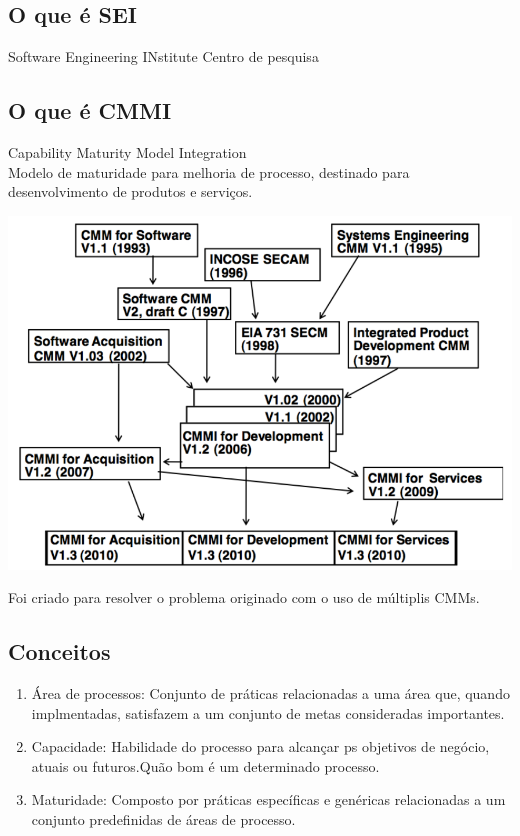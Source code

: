 \documentclass{article}
\begin{document}
\subsection{O que é SEI}
	Software Engineering INstitute \newline
	Centro de pesquisa

\subsection{O que é CMMI} 	
	Capability Maturity Model Integration \\
	Modelo de maturidade para melhoria de processo, destinado para desenvolvimento de produtos e serviços. \\
	\begin{center}
		\includegraphics[scale=0.35]{historico_cmmi} \\
	\end{center}
	Foi criado para resolver o problema originado com o uso de múltiplis CMMs.

\subsection{Conceitos}

\begin{enumerate}
\item Área de processos: Conjunto de práticas relacionadas a uma área que, quando implmentadas, satisfazem a um conjunto de metas consideradas importantes.
\item Capacidade: Habilidade do processo para alcançar ps objetivos de negócio, atuais ou futuros.Quão bom é um determinado processo.
\item Maturidade: Composto por práticas específicas e genéricas relacionadas a um conjunto predefinidas de áreas de processo.
\end{enumerate}
\end{document}
